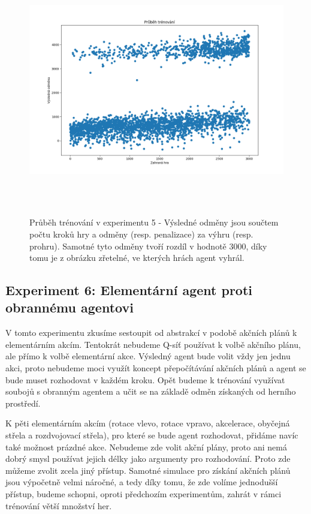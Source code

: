 \begin{figure}[H]\centering
    \includegraphics[width=145mm, height=110mm]{./Obrazky/Experiment05Training.png}
    \caption{Průběh trénování v experimentu 5 - Výsledné odměny jsou součtem počtu kroků hry a odměny (resp. penalizace) za výhru (resp. prohru). Samotné tyto odměny tvoří rozdíl v hodnotě 3000, díky tomu je z obrázku zřetelné, ve kterých hrách agent vyhrál.}
    \label{Průběh trénování experimentu 06}
    \end{figure}



\subsection{Experiment 6: Elementární agent proti obrannému agentovi}
V tomto experimentu zkusíme sestoupit od abstrakcí v podobě akčních plánů k elementárním akcím.
Tentokrát nebudeme Q-síť používat k volbě akčního plánu, ale přímo k volbě elementární akce.
Výsledný agent bude volit vždy jen jednu akci, proto nebudeme moci využít koncept přepočítávání akčních plánů a agent se bude muset rozhodovat v každém kroku.
Opět budeme k trénování využívat soubojů s obranným agentem a učit se na základě odměn získaných od herního prostředí.

\par
K pěti elementárním akcím (rotace vlevo, rotace vpravo, akcelerace, obyčejná střela a rozdvojovací střela), pro které se bude agent rozhodovat, přidáme navíc také možnost prázdné akce. 
Nebudeme zde volit akční plány, proto ani nemá dobrý smysl používat jejich délky jako argumenty pro rozhodování. Proto zde můžeme zvolit zcela jiný přístup.
Samotné simulace pro získání akčních plánů jsou výpočetně velmi náročné, a tedy díky tomu, že zde volíme jednodušší přístup, budeme schopni, oproti předchozím experimentům, zahrát v rámci trénování větší množství her.


